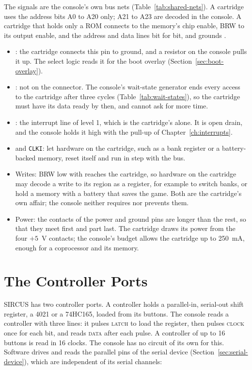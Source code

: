 \noindent The signals are the console's own bus nets (Table~\ref{tab:shared-nets}). A cartridge uses the address bits A0 to
A20 only; A21 to A23 are decoded in the console. A cartridge that holds only a ROM connects  to the
memory's chip enable, BRW to its output enable, and the address and data lines bit for bit, and grounds .

\begin{itemize}
	\item {}: the cartridge connects this pin to ground, and a resistor on the console pulls it up. The select
	      logic reads it for the boot overlay (Section~\ref{sec:boot-overlay}).
	\item {}: not on the connector. The console's wait-state generator ends every access to the cartridge
	      after three cycles (Table~\ref{tab:wait-states}), so the cartridge must have its data ready by then, and cannot
	      ask for more time.
	\item {}: the interrupt line of level 1, which is the cartridge's alone. It is open drain, and the console
	      holds it high with the pull-up of Chapter~\ref{ch:interrupts}.
	\item {} and \texttt{CLKI}: let hardware on the cartridge, such as a bank register or a battery-backed
	      memory, reset itself and run in step with the bus.
	\item Writes: BRW low with  reaches the cartridge, so hardware on the cartridge may decode a write to its
	      region as a register, for example to switch banks, or hold a memory with a battery that saves the game. Both are the
	      cartridge's own affair; the console neither requires nor prevents them.
	\item Power: the contacts of the power and ground pins are longer than the rest, so that they meet first and part last. The
	      cartridge draws its power from the four $+5$~V contacts; the console's budget allows the cartridge up to 250~mA, enough
	      for a coprocessor and its memory.
\end{itemize}

\section{The Controller Ports}
\label{sec:controller-ports}

SIRCUS has two controller ports. A controller holds a parallel-in, serial-out shift register, a 4021 or a 74HC165,
loaded from its buttons. The console reads a controller with three lines: it pulses \textsc{latch} to load the
register, then pulses \textsc{clock} once for each bit, and reads \textsc{data} after each pulse. A controller of up to
16 buttons is read in 16 clocks. The console has no circuit of its own for this. Software drives and reads the parallel
pins of the serial device (Section~\ref{sec:serial-device}), which are independent of its serial channels:

